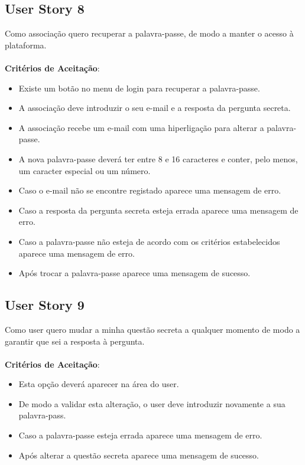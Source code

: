 \documentclass[a4paper,11pt]{article}
\begin{document}
\subsection{User Story 8}
Como associação quero recuperar a palavra-passe, de modo a manter o acesso à plataforma.\\\\
\textbf{Critérios de Aceitação}:
\begin{itemize}
  \item Existe um botão no menu de login para recuperar a palavra-passe.
  \item A associação deve introduzir o seu e-mail e a resposta da pergunta secreta.
  \item A associação recebe um e-mail com uma hiperligação para alterar a palavra-passe.
  \item A nova palavra-passe deverá ter entre 8 e 16 caracteres e conter, pelo menos, um caracter especial ou um número.
  \item Caso o e-mail não se encontre registado aparece uma mensagem de erro.
  \item Caso a resposta da pergunta secreta esteja errada aparece uma mensagem de erro.
  \item Caso a palavra-passe não esteja de acordo com os critérios estabelecidos aparece uma mensagem de erro.
  \item Após trocar a palavra-passe aparece uma mensagem de sucesso.
\end{itemize}

\subsection{User Story 9}
Como user quero mudar a minha questão secreta a qualquer momento de modo a garantir que sei a resposta à pergunta.\\\\
\textbf{Critérios de Aceitação}:
\begin{itemize}
  \item Esta opção deverá aparecer na área do user.
  \item De modo a validar esta alteração, o user deve introduzir novamente a sua palavra-pass.
  \item Caso a palavra-passe esteja errada aparece uma mensagem de erro.
  \item Após alterar a questão secreta aparece uma mensagem de sucesso.
\end{itemize}
\end{document}

